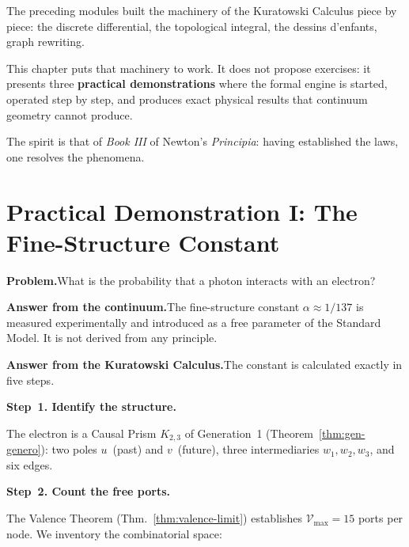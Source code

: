 \begin{introduction}
  \item The preceding modules built the machinery of the Kuratowski
        Calculus piece by piece: the discrete differential, the
        topological integral, the dessins d'enfants, graph rewriting.
  \item This chapter puts that machinery to work. It does not propose
        exercises: it presents three \textbf{practical demonstrations}
        where the formal engine is started, operated step by step, and
        produces exact physical results that continuum geometry cannot
        produce.
  \item The spirit is that of \textit{Book III} of Newton's \textit{Principia}:
        having established the laws, one resolves the phenomena.
\end{introduction}

\bigskip

\section*{Practical Demonstration I: The Fine-Structure Constant}
\label{sec:demo-alpha}

\noindent\textbf{Problem.}\enspace What is the probability that a photon
interacts with an electron?

\noindent\textbf{Answer from the continuum.}\enspace The fine-structure
constant $\alpha \approx 1/137$ is measured experimentally and introduced
as a free parameter of the Standard Model. It is not derived from any
principle.

\noindent\textbf{Answer from the Kuratowski Calculus.}\enspace The
constant is calculated exactly in five steps.

\bigskip
\noindent
\textbf{Step~1. Identify the structure.}

The electron is a Causal Prism $K_{2,3}$ of Generation~1
(Theorem~\ref{thm:gen-genero}): two poles $u$~(past) and $v$~(future),
three intermediaries $w_1, w_2, w_3$, and six edges.

\bigskip
\noindent
\textbf{Step~2. Count the free ports.}

The Valence Theorem (Thm.~\ref{thm:valence-limit}) establishes
$\mathcal{V}_{\max} = 15$ ports per node. We inventory the combinatorial
space:

